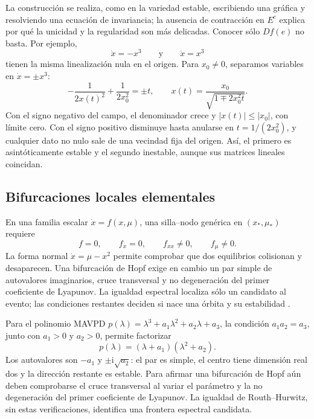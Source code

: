 La construcción se realiza, como en la variedad estable, escribiendo una
gráfica y resolviendo una ecuación de invariancia; la ausencia de contracción
en \(E^c\) explica por qué la unicidad y la regularidad son más delicadas.
Conocer sólo \(Df(e)\) no basta. Por ejemplo,
\begin{equation}
 \dot x=-x^3
 \qquad\text{y}\qquad
 \dot x=x^3
 \label{geo:eq:center-counterexample}
\end{equation}
tienen la misma linealización nula en el origen. Para \(x_0\ne0\),
separamos variables en \(\dot x=\pm x^3\):
\[
 -\frac1{2x(t)^2}+\frac1{2x_0^2}=\pm t,
 \qquad x(t)=\frac{x_0}{\sqrt{1\mp2x_0^2t}}.
\]
Con el signo negativo del campo, el denominador crece y
\(|x(t)|\le|x_0|\), con límite cero. Con el signo positivo disminuye
hasta anularse en \(t=1/(2x_0^2)\), y cualquier dato no nulo sale de una
vecindad fija del origen. Así, el primero es asintóticamente estable y el
segundo inestable, aunque sus matrices lineales coincidan.

\subsection{Bifurcaciones locales elementales}

En una familia escalar \(\dot x=f(x,\mu)\), una silla--nodo genérica en
\((x_*,\mu_*)\) requiere
\begin{equation}
 f=0,\qquad f_x=0,\qquad f_{xx}\ne0,\qquad f_\mu\ne0.
 \label{geo:eq:saddle-node-conditions}
\end{equation}
La forma normal \(\dot x=\mu-x^2\) permite comprobar que dos equilibrios
colisionan y desaparecen. Una bifurcación de Hopf exige en cambio un par simple
de autovalores imaginarios, cruce transversal y no degeneración del primer
coeficiente de Lyapunov. La igualdad espectral localiza sólo un candidato al
evento; las condiciones restantes deciden si nace una órbita y su estabilidad
\cite{Kuznetsov2023Bifurcation,JaurezEtAl2021TGEDII}.

Para el polinomio MAVPD
\(p(\lambda)=\lambda^3+a_1\lambda^2+a_2\lambda+a_3\), la condición
\(a_1a_2=a_3\), junto con \(a_1>0\) y \(a_2>0\), permite factorizar
\[
 p(\lambda)=(\lambda+a_1)(\lambda^2+a_2).
\]
Los autovalores son \(-a_1\) y \(\pm\mathrm i\sqrt{a_2}\): el par
es simple, el centro tiene dimensión real dos y la dirección restante es
estable. Para afirmar una bifurcación de Hopf aún deben comprobarse el
cruce transversal al variar el parámetro y la no degeneración del primer
coeficiente de Lyapunov. La igualdad de Routh--Hurwitz, sin estas
verificaciones, identifica una frontera espectral candidata.

